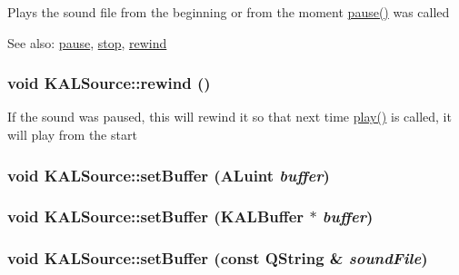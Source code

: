 Plays the sound file from the beginning or from the moment \hyperlink{class_k_a_l_source_5073e178991fd50af8344a7e64491634}{pause()} was called \begin{Desc}
\item[See also:]\hyperlink{class_k_a_l_source_5073e178991fd50af8344a7e64491634}{pause}, \hyperlink{class_k_a_l_source_1796d7faf1bb7614111b3d7477c7c42b}{stop}, \hyperlink{class_k_a_l_source_9c8b97bd784c3c362fd65276b9df03b4}{rewind} \end{Desc}
\hypertarget{class_k_a_l_source_9c8b97bd784c3c362fd65276b9df03b4}{
\subsubsection[{rewind}]{\setlength{\rightskip}{0pt plus 5cm}void KALSource::rewind ()}}
\label{class_k_a_l_source_9c8b97bd784c3c362fd65276b9df03b4}


If the sound was paused, this will rewind it so that next time \hyperlink{class_k_a_l_source_22573a4415c721d03693519b6ea0af96}{play()} is called, it will play from the start \hypertarget{class_k_a_l_source_895cc3f7b79087050a97bed287b97178}{
\subsubsection[{setBuffer}]{\setlength{\rightskip}{0pt plus 5cm}void KALSource::setBuffer (ALuint {\em buffer})}}
\label{class_k_a_l_source_895cc3f7b79087050a97bed287b97178}


\hypertarget{class_k_a_l_source_9e0fe5ad33a2f814f3be868908b09821}{
\subsubsection[{setBuffer}]{\setlength{\rightskip}{0pt plus 5cm}void KALSource::setBuffer ({\bf KALBuffer} $\ast$ {\em buffer})}}
\label{class_k_a_l_source_9e0fe5ad33a2f814f3be868908b09821}


\hypertarget{class_k_a_l_source_efc4601d63ec911b40346c1faef622ff}{
\subsubsection[{setBuffer}]{\setlength{\rightskip}{0pt plus 5cm}void KALSource::setBuffer (const QString \& {\em soundFile})}}
\label{class_k_a_l_source_efc4601d63ec911b40346c1faef622ff}


